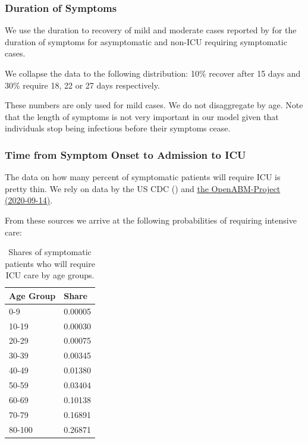 \subsubsection{Duration of Symptoms}

We use the duration to recovery of mild and moderate cases reported by \cite[Figure~S3, Panel~2]{Bi2020} for the duration of symptoms for asymptomatic and non-ICU requiring symptomatic cases.

We collapse the data to the following distribution: 10\% recover after 15 days and 30\% require 18, 22 or 27 days respectively.


These numbers are only used for mild cases. We do not disaggregate by age. Note that the length of symptoms is not very important in our model given that individuals stop being infectious before their symptoms cease.


\subsubsection{Time from Symptom Onset to Admission to ICU}

The data on how many percent of symptomatic patients will require ICU is pretty thin. We rely on data by the US CDC (\cite{Stokes2020}) and \href{https://github.com/BDI-pathogens/OpenABM-Covid19/blob/master/documentation/parameters/parameter_dictionary.md}{the OpenABM-Project (2020-09-14)}.

From these sources we arrive at the following probabilities of requiring intensive care:

\begin{table}[!ht]
    \caption{Shares of symptomatic patients who will require ICU care by age groups.}
    \label{tab:symptomatic-to-ICU}
    \centering

    \begin{tabular}{ll}
        \toprule
        Age Group & Share \\
        \midrule
        0-9 & 0.00005 \\
        10-19 & 0.00030 \\
        20-29 & 0.00075 \\
        30-39 & 0.00345 \\
        40-49 & 0.01380 \\
        50-59 & 0.03404 \\
        60-69 & 0.10138 \\
        70-79 & 0.16891 \\
        80-100 & 0.26871 \\
        \bottomrule
    \end{tabular}

\end{table}

